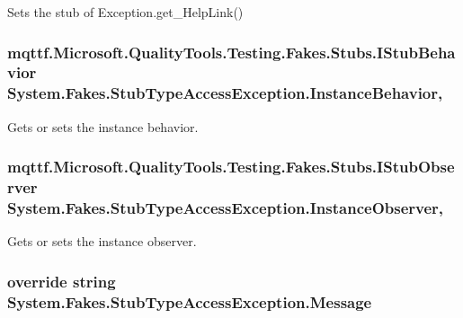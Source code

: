Sets the stub of Exception.\-get\-\_\-\-Help\-Link()

\hypertarget{class_system_1_1_fakes_1_1_stub_type_access_exception_ab6be457a2fd41dda443a3b4effd02792}{
\subsubsection[{Instance\-Behavior}]{\setlength{\rightskip}{0pt plus 5cm}mqttf.\-Microsoft.\-Quality\-Tools.\-Testing.\-Fakes.\-Stubs.\-I\-Stub\-Behavior System.\-Fakes.\-Stub\-Type\-Access\-Exception.\-Instance\-Behavior\hspace{0.3cm}{\ttfamily [get]}, {\ttfamily [set]}}}\label{class_system_1_1_fakes_1_1_stub_type_access_exception_ab6be457a2fd41dda443a3b4effd02792}


Gets or sets the instance behavior.

\hypertarget{class_system_1_1_fakes_1_1_stub_type_access_exception_acb8ca51a33cf8abf327894330cc4472f}{
\subsubsection[{Instance\-Observer}]{\setlength{\rightskip}{0pt plus 5cm}mqttf.\-Microsoft.\-Quality\-Tools.\-Testing.\-Fakes.\-Stubs.\-I\-Stub\-Observer System.\-Fakes.\-Stub\-Type\-Access\-Exception.\-Instance\-Observer\hspace{0.3cm}{\ttfamily [get]}, {\ttfamily [set]}}}\label{class_system_1_1_fakes_1_1_stub_type_access_exception_acb8ca51a33cf8abf327894330cc4472f}


Gets or sets the instance observer.

\hypertarget{class_system_1_1_fakes_1_1_stub_type_access_exception_a3a160e3ca71826c1b0404e3ab604e0a9}{
\subsubsection[{Message}]{\setlength{\rightskip}{0pt plus 5cm}override string System.\-Fakes.\-Stub\-Type\-Access\-Exception.\-Message\hspace{0.3cm}{\ttfamily [get]}}}\label{class_system_1_1_fakes_1_1_stub_type_access_exception_a3a160e3ca71826c1b0404e3ab604e0a9}


